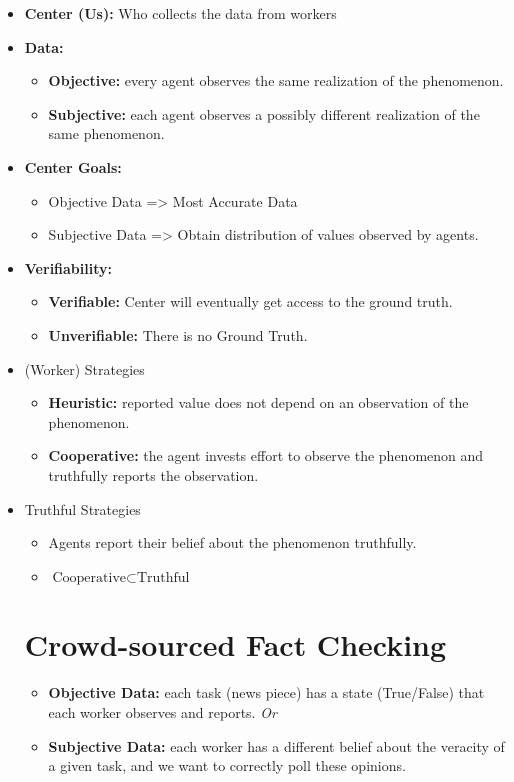 \documentclass{report}
\theoremstyle{definition}
\newcommand{\nitem}[1][]{\item \textbf{#1:}}
\begin{document}
\begin{itemize}

\nitem[Center (Us)] Who collects the data from workers
\nitem[Data] 
\begin{itemize}
    \nitem[Objective] every agent observes the same realization of the phenomenon.
    \nitem[Subjective] each agent observes a possibly different realization of the same phenomenon.
\end{itemize}
\nitem[Center Goals]
\begin{itemize}
    \item Objective Data => Most Accurate Data
    \item Subjective Data => Obtain distribution of values observed by agents. 
\end{itemize}

\nitem[Verifiability]
\begin{itemize}
    \nitem[Verifiable] Center will eventually get access to the ground truth.
    \nitem[Unverifiable] There is no Ground Truth.
\end{itemize}
 
 \item (Worker) Strategies
 \begin{itemize}
     \nitem[Heuristic] reported value does not depend on an observation of the phenomenon.
     \nitem[Cooperative] the agent invests effort to observe the phenomenon and truthfully reports the observation.
 \end{itemize}
 
 \item Truthful Strategies
 \begin{itemize}
     \item Agents report their belief about the phenomenon truthfully.
     \item $\text{Cooperative} \subset \text{Truthful}$
 \end{itemize}
 
 \section{Crowd-sourced Fact Checking}
 \begin{itemize}
     \nitem[Objective Data] each task (news piece) has a state (True/False) that each worker observes and reports. \textit{Or} 
     \nitem[Subjective Data] each worker has a different belief about the veracity of a given task, and we want to correctly poll these opinions.
 \end{itemize}
  

\end{itemize}
\end{document}
